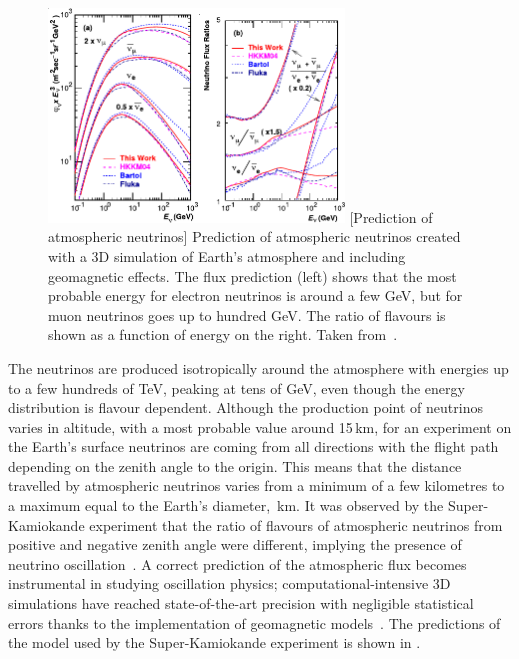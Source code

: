 \begin{figure}
	\centering
	\includegraphics[width=0.7\textwidth]{pics/honda_flux.pdf}
	[Prediction of atmospheric neutrinos]%
	{Prediction of atmospheric neutrinos created with a 3D simulation %
	of Earth's atmosphere and including geomagnetic effects.
	The flux prediction (left) shows that the most probable energy for electron neutrinos is 
	around a few GeV, but for muon neutrinos goes up to hundred GeV.
	The ratio of flavours is shown as a function of energy on the right.
	Taken from~\cite{Honda:2004yz}.}
	\label{fig:honda_flux}
\end{figure}

The neutrinos are produced isotropically around the atmosphere with energies up to a few hundreds of TeV, %
peaking at tens of GeV, even though the energy distribution is flavour dependent.
Although the production point of neutrinos varies in altitude, with a most probable value around 15\,km,
for an experiment on the Earth's surface neutrinos are coming from all directions with the flight path depending %
on the zenith angle to the origin.
This means that the distance travelled by atmospheric neutrinos varies from a minimum of a few kilometres %
to a maximum equal to the Earth's diameter, \,km.
It was observed by the Super-Kamiokande experiment that the ratio of flavours of atmospheric neutrinos from %
positive and negative zenith angle were different, implying the presence of neutrino oscillation~\cite{Fukuda:1998mi}.
A correct prediction of the atmospheric flux becomes instrumental in studying oscillation physics; %
computational-intensive 3D simulations have reached state-of-the-art precision with negligible statistical errors %
thanks to the implementation of geomagnetic models~\cite{Honda:2004yz, Honda:2006qj}.
The predictions of the model used by the Super-Kamiokande experiment is shown in .


